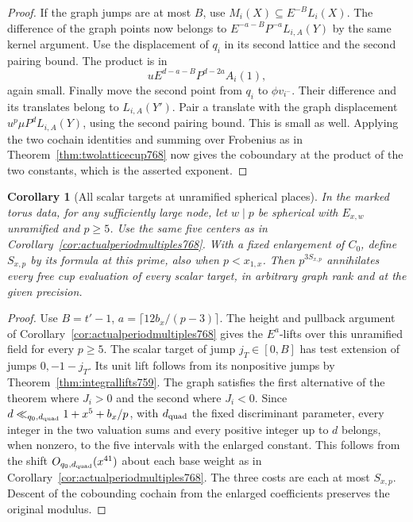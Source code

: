 \documentclass[a4paper,11pt]{article}
\newtheorem{corollary}[proposition]{Corollary}
\theoremstyle{definition}
\theoremstyle{remark}
\numberwithin{equation}{section}
\begin{document}
\begin{proof}
If the graph jumps are at most \(B\), use
\(M_i(X)\subseteq E^{-B} L_i(X)\).
The difference of the graph points now belongs to
\(E^{-a-B}P^{-a} L_{i,A}(Y)\) by the same kernel
argument. Use the displacement of \(q_i\) in its second
lattice and the second pairing bound. The product is in
\[
                    u E^{d-a-B}P^{d-2a} A_i(1),
\]
again small. Finally move the second point from \(q_i\)
to \(\phi v_{i^-}\). Their difference and its translates
belong to \(L_{i,A}(Y')\). Pair a translate with the graph
displacement \(u^p\mu P^d L_{i,A}(Y)\), using the second
pairing bound. This is small as well. Applying the two
cochain identities and summing over Frobenius as in
Theorem~\ref{thm:twolatticecup768} now gives the
coboundary at the product of the two constants, which
is the asserted exponent.
\end{proof}

\begin{corollary}[All scalar targets at unramified spherical places]
\leavevmode\label{cor:allscalartests770}
In the marked torus data, for any sufficiently large node,
let \(w\mid p\) be spherical with \(E_{x,w}\) unramified
and \(p\ge5\). Use the same five centers as in
Corollary~\ref{cor:actualperiodmultiples768}. With a fixed
enlargement of \(C_0\), define \(S_{x,p}\) by its formula
at this prime, also when \(p<x_{1,x}\). Then \(p^{3S_{x,p}}\)
annihilates every free cup evaluation of every scalar
target, in arbitrary graph rank and at the given precision.
\end{corollary}
\begin{proof}
Use \(B=t'-1\), \(a=\lceil12b_x/(p-3)\rceil\). The
height and pullback argument of
Corollary~\ref{cor:actualperiodmultiples768} gives the
\(E^a\)-lifts over this unramified field for every \(p\ge5\).
The scalar target of jump \(j_T\in[0,B]\) has test
extension of jumps \(0,-1-j_T\). Its unit lift follows
from its nonpositive jumps by
Theorem~\ref{thm:integrallifts759}. The graph satisfies
the first alternative of the theorem where \(J_i>0\)
and the second where \(J_i<0\). Since
\(d\ll_{q_0,d_{\rm quad}}1+x^5+b_x/p\), with \(d_{\rm quad}\)
the fixed discriminant parameter, every integer in the
two valuation sums and every positive integer up to \(d\)
belongs, when nonzero, to the five intervals with the
enlarged constant. This follows from the shift
\(O_{q_0,d_{\rm quad}}(x^{41})\) about each base weight
as in Corollary~\ref{cor:actualperiodmultiples768}.
The three costs are each at most \(S_{x,p}\). Descent
of the cobounding cochain from the enlarged coefficients
preserves the original modulus.
\end{proof}
\clearpage
\end{document}
